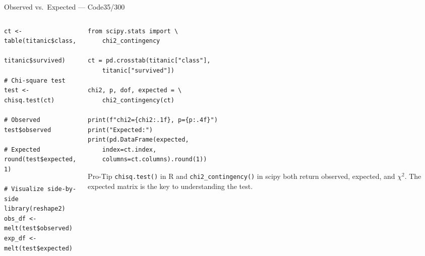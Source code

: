 \documentclass[10pt]{beamer}
\newcommand{\smark}[1]{\hfill{\scriptsize\color{codegray}#1}}
\begin{document}
\begin{frame}[fragile]{Observed vs.\ Expected --- Code}\smark{35/300}
\begin{columns}[T]
\begin{column}{0.48\textwidth}
\begin{lstlisting}[style=Rstyle]
ct <- table(titanic$class,
            titanic$survived)

# Chi-square test
test <- chisq.test(ct)

# Observed
test$observed

# Expected
round(test$expected, 1)

# Visualize side-by-side
library(reshape2)
obs_df <- melt(test$observed)
exp_df <- melt(test$expected)
\end{lstlisting}
\end{column}
\begin{column}{0.48\textwidth}
\begin{lstlisting}[style=Pystyle]
from scipy.stats import \
    chi2_contingency

ct = pd.crosstab(titanic["class"],
    titanic["survived"])

chi2, p, dof, expected = \
    chi2_contingency(ct)

print(f"chi2={chi2:.1f}, p={p:.4f}")
print("Expected:")
print(pd.DataFrame(expected,
    index=ct.index,
    columns=ct.columns).round(1))
\end{lstlisting}
\vspace{0.1cm}
\begin{alertblock}{Pro-Tip}
    \scriptsize \texttt{chisq.test()} in R and \texttt{chi2\_contingency()} in scipy both return observed, expected, and $\chi^2$. The expected matrix is the key to understanding the test.
\end{alertblock}
\end{column}
\end{columns}
\end{frame}
\end{document}

